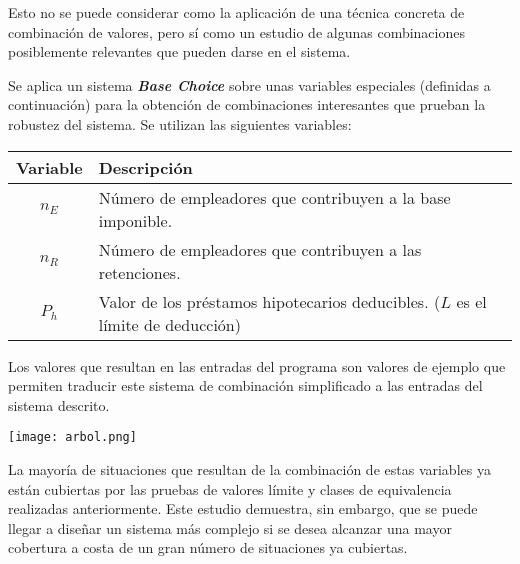 \begin{notebox}
	Esto no se puede considerar como la aplicación de una técnica concreta de combinación de valores,
	pero sí como un estudio de algunas combinaciones posiblemente relevantes que pueden darse en el
	sistema.
\end{notebox}

Se aplica un sistema \textbf{\textit{Base Choice}} sobre unas variables especiales
(definidas a continuación) para la obtención de combinaciones interesantes que prueban
la robustez del sistema. Se utilizan las siguientes variables:

\begin{table}[H]
	\centering
	\begin{tabular}{|c|l|}
		\hline
		\rowcolor{gray!50}
		\textbf{Variable} & \textbf{Descripción} \\
		\hline
		\hline
		$n_{E}$ & Número de empleadores que contribuyen a la base imponible. \\
		$n_{R}$ & Número de empleadores que contribuyen a las retenciones. \\
		$P_{h}$ & Valor de los préstamos hipotecarios deducibles. ($L$ es el límite de deducción) \\
		\hline
	\end{tabular}
\end{table}

Los valores que resultan en las entradas del programa son valores de ejemplo que
permiten traducir este sistema de combinación simplificado a las entradas del
sistema descrito.

\begin{minipage}{\linewidth}
	\centering
	\texttt{[image: arbol.png]}
\end{minipage}

La mayoría de situaciones que resultan de la combinación de estas variables ya están
cubiertas por las pruebas de valores límite y clases de equivalencia realizadas anteriormente.
Este estudio demuestra, sin embargo, que se puede llegar a diseñar un sistema más complejo si
se desea alcanzar una mayor cobertura a costa de un gran número de situaciones ya cubiertas.
